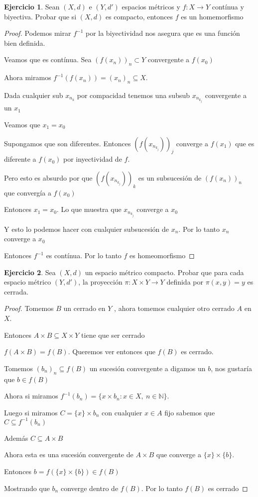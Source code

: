 \documentclass[11pt]{report}
\newcommand{\N}{\mathbb{N}}
\newcommand{\ra}{\rightarrow}
\theoremstyle{definition}
\newtheorem{ej}{Ejercicio}
\begin{document}
	\begin{ej}
		Sean $(X,d)$ e $(Y,d')$ espacios métricos y $f: X \ra Y$ contínua y biyectiva. Probar que si $(X,d)$ es compacto, entonces $f$ es un homemorfismo
		\begin{proof}
			Podemos mirar $f^{-1}$ por la biyectividad nos asegura que es una función bien definida. 

 			Veamos que es contínua. Sea $(f(x_n))_n \subset Y$  convergente a $f(x_0)$

			Ahora miramos $f^{-1}(f(x_n)) = (x_n)_n \subseteq X$. 

			Dada cualquier sub $x_{n_k}$ por compacidad tenemos una subsub $x_{n_{k_j}}$ convergente a un $x_1$ 

			Veamos que $x_1 = x_0$

			Supongamos que son diferentes. Entonces $(f(x_{n_{k_j}}))_j$ converge a $f(x_1)$ que es diferente a $f(x_0)$ por inyectividad de $f$.

			Pero esto es absurdo por que $(f(x_{n_{k_j}}))_k$ es un subsucesión de $(f(x_n))_n$ que convergía a $f(x_0)$

			Entonces $x_1 = x_0$. Lo que muestra que $x_{n_{k_j}}$ converge a $x_0$

			Y esto lo podemos hacer con cualquier subsucesión de $x_n$. Por lo tanto $x_n$ converge a $x_0$

			Entonces $f^{-1}$ es contínua. Por lo tanto $f$ es homeomorfismo

		\end{proof}
	\end{ej}
	
	\begin{ej}
		Sea $(X,d)$ un espacio métrico compacto. Probar que para cada espacio métrico $(Y,d')$, la proyección $\pi :X \times Y \ra Y$ definida por $\pi (x,y) = y$ es cerrada.
		\begin{proof}
			Tomemos $B$ un cerrado en $Y$ , ahora tomemos cualquier otro cerrado $A$ en $X$.

			Entonces $A \times B \subseteq X \times Y $ tiene que ser cerrado

			$f(A\times B) = f(B)$. Queremos ver entonces que $f(B)$ es cerrado. 

			Tomemos $(b_n)_n \subseteq f(B)$ un sucesión convergente a digamos un $b$, nos gustaría que $b \in f(B)$

			Ahora si miramos  $f^{-1}(b_n) = \{x \times b_n : x \in X, \ n\in \N \}$. 
			
			Luego si miramos $C = \{x\} \times b_n $ con cualquier $x \in A$ fijo sabemos que $C \subseteq f^{-1}(b_n)$ 

			Además $C \subseteq A\times B$

			Ahora esta es una sucesión convergente de $A \times B$ que converge a  $\{x\} \times \{b\}$.

			Entonces $b = f(\{x\} \times \{b\}) \in f(B)$

			Mostrando que $b_n$ converge dentro de $f(B)$. Por lo tanto $f(B)$ es cerrado
		\end{proof}
		
	\end{ej}
	
\end{document}
